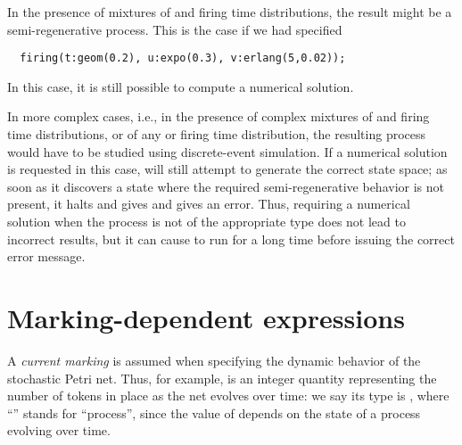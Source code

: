In the presence of mixtures of  and  firing time
distributions, the result might be a semi-regenerative process.
This is the case if we had specified
\begin{lstlisting}
  firing(t:geom(0.2), u:expo(0.3), v:erlang(5,0.02));
\end{lstlisting} 
In this case, it is still possible to compute a numerical solution.

In more complex cases, i.e., in the presence of complex mixtures of
 and  firing time distributions,
or of any  or  firing time distribution,
the resulting process would have to be studied using discrete-event simulation.
If a numerical solution is requested in this case, {\smart} will still
attempt to generate the correct state space;
as soon as it discovers a state where the required semi-regenerative behavior
is not present, it halts and gives and gives an error.
Thus, requiring a numerical solution when the process is not of the appropriate
type does not lead to incorrect results, but it can cause {\smart} to run for
a long time before issuing the correct error message.
\\







\section{Marking-dependent expressions}
\label{SEC:spn-predefined-state-functions}

A \emph{current marking} is assumed when specifying the dynamic behavior
of the stochastic Petri net.
Thus, for example,  is an integer quantity representing
the number of tokens in place  as the net evolves over time:
we say its type is , where ``'' stands
for ``process'', since the value of  depends on the
state of a process evolving over time.

